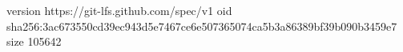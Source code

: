 version https://git-lfs.github.com/spec/v1
oid sha256:3ac673550cd39ec943d5e7467ce6e507365074ca5b3a86389bf39b090b3459e7
size 105642

